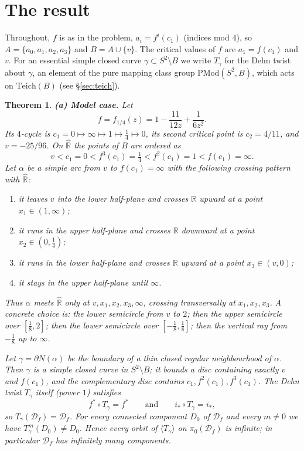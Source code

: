 \documentclass[11pt]{article}
\newtheorem{theorem}{Theorem}
\theoremstyle{definition}
\newcommand{\Teich}{\mathrm{Teich}}
\newcommand{\PMod}{\mathrm{PMod}}
\newcommand{\Rh}{\hat{\mathbb R}}
\newcommand{\D}{\mathcal D}
\begin{document}
\section{The result}

Throughout, $f$ is as in the problem, $a_i=f^{i}(c_1)$ (indices mod $4$), so $A=\{a_0,a_1,a_2,a_3\}$ and $B=A\cup\{v\}$. The critical values of $f$ are $a_1=f(c_1)$ and $v$. For an essential simple closed curve $\gamma\subset S^2\setminus B$ we write $T_\gamma$ for the Dehn twist about $\gamma$, an element of the pure mapping class group $\PMod(S^2,B)$, which acts on $\Teich(B)$ (see \S\ref{sec:teich}).

\begin{theorem}\label{thm:main}
\textbf{(a) Model case.} Let
\[f=f_{1/4}(z)=1-\frac{11}{12z}+\frac1{6z^2}.\]
Its $4$-cycle is $c_1=0\mapsto\infty\mapsto1\mapsto\tfrac14\mapsto0$, its second critical point is $c_2=4/11$, and $v=-25/96$. On $\Rh$ the points of $B$ are ordered as
\[v<c_1=0<f^{3}(c_1)=\tfrac14<f^{2}(c_1)=1<f(c_1)=\infty .\]
Let $\alpha$ be a simple arc from $v$ to $f(c_1)=\infty$ with the following crossing pattern with $\Rh$:
\begin{enumerate}[label=\textup{(\arabic*)}]
\item it leaves $v$ into the lower half-plane and crosses $\mathbb R$ upward at a point $x_1\in(1,\infty)$;
\item it runs in the upper half-plane and crosses $\mathbb R$ downward at a point $x_2\in(0,\tfrac14)$;
\item it runs in the lower half-plane and crosses $\mathbb R$ upward at a point $x_3\in(v,0)$;
\item it stays in the upper half-plane until $\infty$.
\end{enumerate}
Thus $\alpha$ meets $\Rh$ only at $v,x_1,x_2,x_3,\infty$, crossing transversally at $x_1,x_2,x_3$. A concrete choice is: the lower semicircle from $v$ to $2$; then the upper semicircle over $[\tfrac18,2]$; then the lower semicircle over $[-\tfrac18,\tfrac18]$; then the vertical ray from $-\tfrac18$ up to $\infty$.

Let $\gamma=\partial N(\alpha)$ be the boundary of a thin closed regular neighbourhood of $\alpha$. Then $\gamma$ is a simple closed curve in $S^2\setminus B$; it bounds a disc containing exactly $v$ and $f(c_1)$, and the complementary disc contains $c_1,f^2(c_1),f^3(c_1)$. The Dehn twist $T_\gamma$ itself (power $1$) satisfies
\[f^*\circ T_\gamma=f^*\qquad\text{and}\qquad i_*\circ T_\gamma=i_*,\]
so $T_\gamma(\D_f)=\D_f$. For every connected component $D_0$ of $\D_f$ and every $m\ne0$ we have $T_\gamma^m(D_0)\ne D_0$. Hence every orbit of $\langle T_\gamma\rangle$ on $\pi_0(\D_f)$ is infinite; in particular $\D_f$ has infinitely many components.


\end{theorem}
\end{document}
